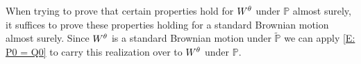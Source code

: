 When trying to prove that certain properties hold for $W^{\theta}$ under $\mathbb{P}$ almost surely,
it suffices to prove these properties holding for a standard Brownian motion almost surely.
Since $W^{\theta}$ is a standard Brownian motion under $\tilde{\mathbb{P}}$ we can apply \eqref{E: P0 = Q0}
to carry this realization over to $W^{\theta}$ under $\mathbb{P}$.
